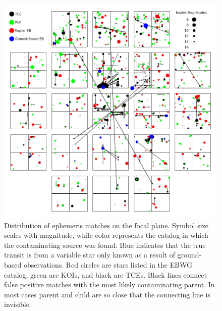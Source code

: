 \begin{figure}[ht]
\centering
\includegraphics[width=\linewidth]{CCDPlot.pdf}
\caption{Distribution of ephemeris matches on the focal plane. Symbol size scales with magnitude, while color represents the catalog in which the contaminating source was found. Blue indicates that the true transit is from a variable star only known as a result of ground-based observations. Red circles are stars listed in the \kepler{} EBWG catalog, green are KOIs, and black are TCEs. Black lines connect false positive matches with the most likely contaminating parent. In most cases parent and child are so close that the connecting line is invisible.}
\label{ephemmatchfig}
\end{figure}



